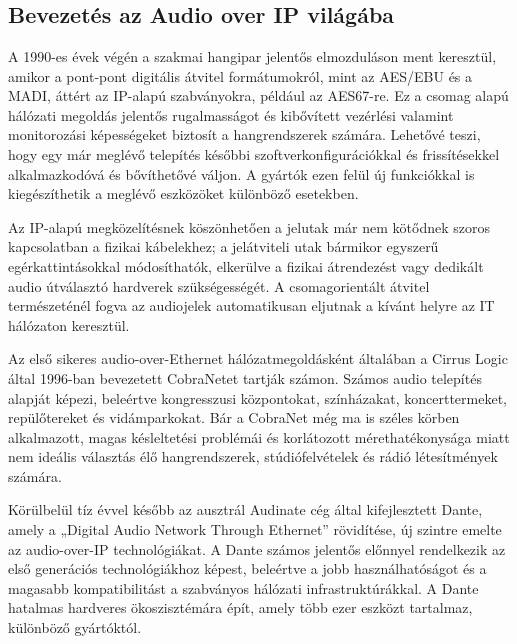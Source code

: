 \chapter{\AudioOverIp}
\section{Bevezetés az Audio over IP világába}
A 1990-es évek végén a szakmai hangipar jelentős elmozduláson ment keresztül, amikor a pont-pont digitális 
átvitel formátumokról, mint az AES/EBU és a MADI, áttért az IP-alapú szabványokra, például az AES67-re. 
Ez a csomag alapú hálózati megoldás jelentős rugalmasságot és kibővített vezérlési valamint monitorozási 
képességeket biztosít a hangrendszerek számára. Lehetővé teszi, hogy egy már meglévő telepítés későbbi 
szoftverkonfigurációkkal és frissítésekkel alkalmazkodóvá és bővíthetővé váljon. 
A gyártók ezen felül új funkciókkal is kiegészíthetik a meglévő eszközöket különböző esetekben.

Az IP-alapú megközelítésnek köszönhetően a jelutak már nem kötődnek szoros 
kapcsolatban a fizikai kábelekhez; a jelátviteli utak bármikor egyszerű egérkattintásokkal módosíthatók, 
elkerülve a fizikai átrendezést vagy dedikált audio útválasztó hardverek szükségességét. 
A csomagorientált átvitel természeténél fogva az audiojelek automatikusan eljutnak a kívánt helyre az IT hálózaton keresztül.

Az első sikeres audio-over-Ethernet hálózatmegoldásként általában a Cirrus Logic által 1996-ban bevezetett 
CobraNetet tartják számon. Számos audio telepítés alapját képezi, beleértve kongresszusi központokat, színházakat, koncerttermeket, repülőtereket és vidámparkokat. Bár a CobraNet még ma is széles körben alkalmazott, magas késleltetési problémái és korlátozott mérethatékonysága miatt nem ideális választás élő hangrendszerek, stúdiófelvételek és rádió létesítmények számára.

Körülbelül tíz évvel később az ausztrál Audinate cég által kifejlesztett Dante, 
amely a „Digital Audio Network Through Ethernet” rövidítése, új szintre emelte az audio-over-IP technológiákat. A Dante számos jelentős előnnyel rendelkezik az első generációs technológiákhoz képest, beleértve a jobb használhatóságot és a magasabb kompatibilitást a szabványos hálózati infrastruktúrákkal. A Dante hatalmas hardveres ökoszisztémára épít, amely több ezer eszközt tartalmaz, különböző gyártóktól.

